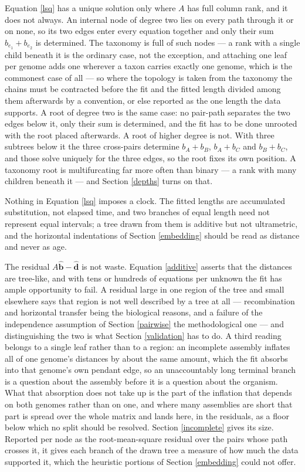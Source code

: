 \documentclass[pdflatex,sn-vancouver-num]{sn-jnl}
\begin{document}
Equation \eqref{lsq} has a unique solution only where $A$ has full column rank, and it does not
always. An internal node of degree two lies on every path through it or on none, so its two edges
enter every equation together and only their sum $b_{e_1} + b_{e_2}$ is determined. The taxonomy is
full of such nodes --- a rank with a single child beneath it is the ordinary case, not the exception,
and attaching one leaf per genome adds one wherever a taxon carries exactly one genome, which is the
commonest case of all --- so where the topology is taken from the taxonomy the chains must be contracted before the fit and
the fitted length divided among them afterwards by a convention, or else reported as the one length
the data supports. A root of degree two is the same case: no pair-path separates the two edges
below it, only their sum is determined, and the fit has to be done unrooted with the root placed
afterwards. A root of higher degree is not. With three subtrees below it the three cross-pairs
determine $b_A + b_B$, $b_A + b_C$ and $b_B + b_C$, and those solve uniquely for the three edges, so
the root fixes its own position. A taxonomy root is multifurcating far more often than binary --- a
rank with many children beneath it --- and Section \ref{depths} turns on that.

Nothing in Equation \eqref{lsq} imposes a clock. The fitted lengths are accumulated substitution,
not elapsed time, and two branches of equal length need not represent equal intervals; a tree drawn
from them is additive but not ultrametric, and the horizontal indentations of
Section \ref{embedding} should be read as distance and never as age.

The residual $A\widehat{\mathbf{b}} - \widehat{\mathbf{d}}$ is not waste. Equation \eqref{additive}
asserts that the distances are tree-like, and with tens or hundreds of equations per unknown the fit
has ample opportunity to fail. A residual large in one region of the tree and small elsewhere says
that region is not well described by a tree at all --- recombination and horizontal transfer being
the biological reasons, and a failure of the independence assumption of Section \ref{pairwise} the
methodological one --- and distinguishing the two is what Section \ref{validation} has to do. A third
reading belongs to a single leaf rather than to a region: an incomplete assembly inflates all of one
genome's distances by about the same amount, which the fit absorbs into that genome's own pendant
edge, so an unaccountably long terminal branch is a question about the assembly before it is a
question about the organism. What that absorption does not take up is the part of the inflation that
depends on both genomes rather than on one, and where many assemblies are short that part is spread
over the whole matrix and lands here, in the residuals, as a floor below which no split should be
resolved. Section \ref{incomplete} gives its size.
Reported per node as the root-mean-square residual over the pairs whose path crosses it, it gives
each branch of the drawn tree a measure of how much the data supported it, which the heuristic
portions of Section \ref{embedding} could not offer.
\end{document}
